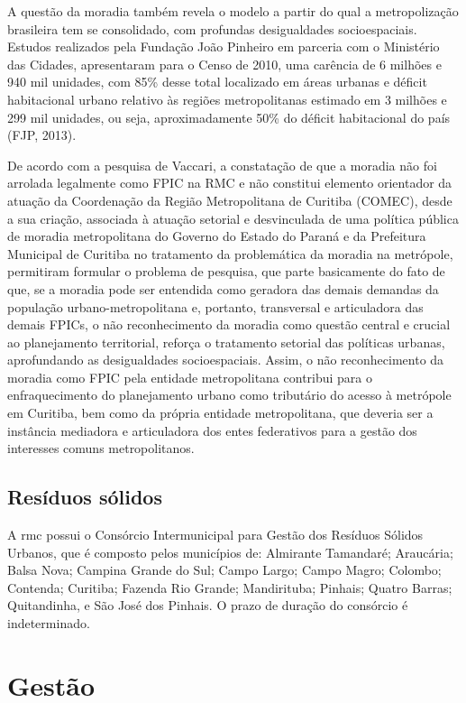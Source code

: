 	A questão da moradia também revela o modelo a partir do qual a metropolização brasileira tem se consolidado, com profundas desigualdades socioespaciais. Estudos realizados pela Fundação João Pinheiro em parceria com o Ministério das Cidades, apresentaram para o Censo de 2010, uma carência de 6 milhões e 940 mil unidades, com 85\% desse total localizado em áreas urbanas e déficit habitacional urbano relativo às regiões metropolitanas estimado em 3 milhões e 299 mil unidades, ou seja, aproximadamente 50\% do déficit habitacional do país (FJP, 2013).
	
	De acordo com a pesquisa de Vaccari, a constatação de que a moradia não foi arrolada legalmente como FPIC na RMC e não constitui elemento orientador da atuação da Coordenação da Região Metropolitana de Curitiba (COMEC), desde a sua criação, associada à atuação setorial e desvinculada de uma política pública de moradia metropolitana do Governo do Estado do Paraná e da Prefeitura Municipal de Curitiba no tratamento da problemática da moradia na metrópole, permitiram formular o problema de pesquisa, que parte basicamente do fato de que, se a moradia pode ser entendida como geradora das demais demandas da população urbano-metropolitana e, portanto, transversal e articuladora das demais FPICs, o não reconhecimento da moradia como questão central e crucial ao planejamento territorial, reforça o tratamento setorial das políticas urbanas, aprofundando as desigualdades socioespaciais. Assim, o não reconhecimento da moradia como FPIC pela entidade metropolitana contribui para o enfraquecimento do planejamento urbano como tributário do acesso à metrópole em Curitiba, bem como da própria entidade metropolitana, que deveria ser a instância mediadora e articuladora dos entes federativos para a gestão dos interesses comuns metropolitanos.
	
	\subsection{Resíduos sólidos}
	
	A \gls{rmc} possui o Consórcio Intermunicipal para Gestão dos Resíduos Sólidos Urbanos, que é composto pelos municípios de: Almirante Tamandaré; Araucária; Balsa Nova; Campina Grande do Sul; Campo Largo; Campo Magro; Colombo; Contenda; Curitiba; Fazenda Rio Grande; Mandirituba; Pinhais; Quatro Barras; Quitandinha, e São José dos Pinhais. O prazo de duração do consórcio é indeterminado.
	
	\section{Gestão}
	
